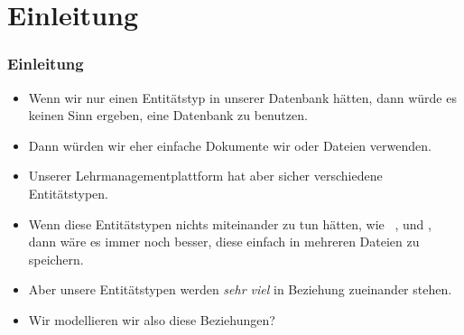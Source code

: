 \documentclass[aspectratio=169,mathserif,notheorems]{beamer}%
\subtitle{29.~Konzeptuelles Schema:~Beziehungen}%
\begin{document}
%
%
\startPresentation%
%
\section{Einleitung}%
%
\begin{frame}%
\frametitle{Einleitung}%
\begin{itemize}%
\item Wenn wir nur einen Entitätstyp in unserer Datenbank hätten, dann würde es keinen Sinn ergeben, eine Datenbank zu benutzen.%
%
\item<2-> Dann würden wir eher einfache Dokumente wir \cite{RFC4180} oder \cite{BPSMM2008EMLX1FE,K2019ITXJY,CH2013XFCAMLTMC} Dateien verwenden.%
%
\item<3-> Unserer Lehrmanagementplattform hat aber sicher verschiedene Entitätstypen.%
%
\item<4-> Wenn diese Entitätstypen nichts miteinander zu tun hätten, wie \DEzB\ ,  und , dann wäre es immer noch besser, diese einfach in mehreren Dateien zu speichern.%
%
\item<5-> Aber unsere Entitätstypen werden \emph{sehr viel} in Beziehung zueinander stehen.%
%
\item<6-> Wir modellieren wir also diese Beziehungen?%
\end{itemize}%
\end{frame}%
%
\end{document}
